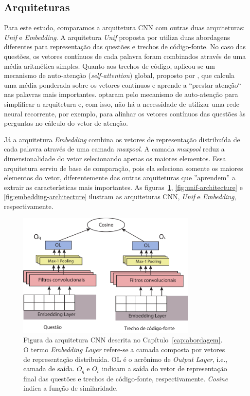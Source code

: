 \subsection{Arquiteturas}

Para este estudo, comparamos a arquitetura CNN com outras duas arquiteturas: \textit{Unif} e \textit{Embedding}. A arquitetura \textit{Unif} proposta por \cite{cambronero-deep-learning-code-search:2019} utiliza duas abordagens diferentes para representação das questões e trechos de código-fonte. No caso das questões, os vetores contínuos de cada palavra foram combinados através de uma média aritmética simples. Quanto aos trechos de código, aplicou-se um mecanismo de auto-atenção (\textit{self-attention}) global, proposto por \cite{luong-etal-2015-effective}, que calcula uma média ponderada sobre os vetores contínuos e aprende a ``prestar atenção`` nas palavras mais importantes. \cite{cambronero-deep-learning-code-search:2019} optaram pelo mecanismo de auto-atenção para simplificar a arquitetura e, com isso, não há a necessidade de utilizar uma rede neural recorrente, por exemplo, para alinhar os vetores contínuos das questões às perguntas no cálculo do vetor de atenção.

Já a arquitetura \textit{Embedding} combina os vetores de representação distribuída de cada palavra através de uma camada \textit{maxpool}. A camada \textit{maxpool} reduz a dimensionalidade do vetor selecionando apenas os maiores elementos. Essa arquitetura serviu de base de comparação, pois ela seleciona somente os maiores elementos do vetor, diferentemente das outras arquiteturas que ''aprendem'' a extrair as características mais importantes.  As figuras~\ref{fig:cnn-architecture}, \ref{fig:unif-architecture} e \ref{fig:embedding-architecture} ilustram as arquiteturas CNN, \textit{Unif} e \textit{Embedding}, respectivamente.
\begin{figure}[h]
    \centering
    \includegraphics[width=0.8\textwidth]{figuras/cap-experimento/cnn-architecture-proposal.pdf}
    \caption[Figura da arquitetura CNN descrita no Capítulo~\ref{cap:abordagem}.]{Figura da arquitetura CNN descrita no Capítulo~\ref{cap:abordagem}. O termo \emph{Embedding Layer} refere-se a camada composta por vetores de representação distribuída. OL é o acrônimo de \emph{Output Layer}, i.e., camada de saída. $O_{q}$ e $O_{c}$ indicam a saída do vetor de representação final das questões e trechos de código-fonte, respectivamente. \emph{Cosine} indica a função de similaridade.}
    \label{fig:cnn-architecture}
\end{figure}

